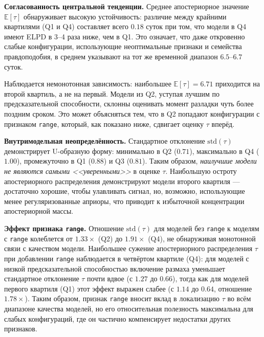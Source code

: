 \documentclass[14pt]{mmcs_article}
\begin{document}
	\textbf{Согласованность центральной тенденции.}
	Среднее апостериорное значение $\mathbb{E}[\tau]$ обнаруживает
	высокую устойчивость: различие между крайними квартилями (Q1
	и Q4) составляет всего $0.18$ суток при
	том, что модели в Q4 имеют ELPD в 3--4 раза ниже, чем
	в Q1. Это означает, что даже откровенно слабые конфигурации,
	использующие неоптимальные признаки и семейства правдоподобия,
	в среднем указывают на тот же временной диапазон $6.5$--$6.7$
	суток.
	
	Наблюдается немонотонная зависимость: наибольшее
	$\mathbb{E}[\tau] = 6.71$ приходится на второй квартиль, а не
	на первый. Модели из Q2, уступая лучшим по предсказательной
	способности, склонны оценивать момент разладки чуть более
	поздним сроком. Это может объясняться тем, что в Q2 попадают
	конфигурации с признаком \texttt{range}, который, как показано
	ниже, сдвигает оценку $\tau$ вперёд.
	
	\textbf{Внутримодельная неопределённость.}
	Стандартное отклонение $\mathrm{std}(\tau)$ демонстрирует
	U-образную форму: минимально в Q2 ($0.71$), максимально в Q4
	($1.00$), промежуточно в Q1 ($0.88$) и Q3 ($0.81$). Таким
	образом, \textit{наилучшие модели не являются самыми
		<<уверенными>>} в оценке $\tau$. Наибольшую остроту
	апостериорного распределения демонстрируют модели второго
	квартиля — достаточно хорошие, чтобы улавливать сигнал, но,
	возможно, использующие менее регуляризованные априоры, что
	приводит к избыточной концентрации апостериорной массы.
	
	\textbf{Эффект признака \texttt{range}.}
	Отношение $\mathrm{std}(\tau)$ для моделей без \texttt{range}
	к моделям с \texttt{range} колеблется от $1.33\times$ (Q2) до
	$1.91\times$ (Q4), не обнаруживая монотонной связи с качеством
	модели. Наибольшее сужение апостериорного распределения
	$\tau$ при добавлении \texttt{range} наблюдается в четвёртом
	квартиле (Q4): для моделей с низкой предсказательной
	способностью включение размаха уменьшает стандартное
	отклонение $\tau$ почти вдвое (с $1.27$ до $0.66$), тогда как
	для моделей первого квартиля (Q1) этот эффект выражен слабее
	(с $1.14$ до $0.64$, отношение $1.78\times$). Таким образом,
	признак \texttt{range} вносит вклад в локализацию $\tau$ во
	всём диапазоне качества моделей, но его относительная
	полезность максимальна для слабых конфигураций, где он
	частично компенсирует недостатки других признаков.
	
\end{document}
